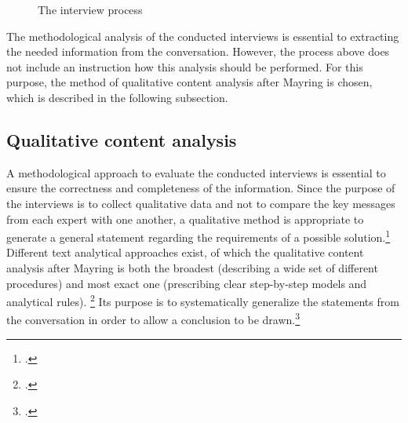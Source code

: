 \begin{figure}
    \centering
    
    \caption[The interview process]{The interview process\protect\footnotemark}
    \label{fig:InterviewProcess}
\end{figure}


The methodological analysis of the conducted interviews is essential to extracting the needed information from the conversation. However, the process above does not include an instruction how this analysis should be performed. For this purpose, the method of qualitative content analysis after Mayring is chosen, which is described in the following subsection.

\subsection{Qualitative content analysis} \label{subsec:Mayring}
A methodological approach to evaluate the conducted interviews is essential to ensure the correctness and completeness of the information. Since the purpose of the interviews is to collect qualitative data and not to compare the key messages from each expert with one another, a qualitative method is appropriate to generate a general statement regarding the requirements of a possible solution.\footcite[Cf.][p.456]{MeuserExpertInneninterviewsvielfacherprobt1991} Different text analytical approaches exist, of which the qualitative content analysis after Mayring is both the broadest (describing a wide set of different procedures) and most exact one (prescribing clear step-by-step models and analytical rules). \footcite[Cf.][p.197]{SteiglederstrukturierendequalitativeInhaltsanalyse2008} Its purpose is to systematically generalize the statements from the conversation in order to allow a conclusion to be drawn.\footcite[Cf.][p.13]{MayringQualitativeContentAnalysis2014}
